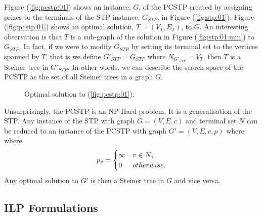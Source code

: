 Figure (\ref{fig:pcstp:01}) shows an instance, $G$, of the PCSTP created by assigning prizes to the terminals of the STP instance, $G_{STP}$, in Figure (\ref{fig:stp:01}).
Figure (\ref{fig:pcstp:01})
shows an optimal solution, $T = (V_T, E_T)$, to $G$. An interesting observation is that
$T$ is a sub-graph of the solution in Figure (\ref{fig:stp:01:min}) to $G_{STP}$.
In fact, if we were to modify $G_{STP}$ by setting its terminal set to the vertices spanned
by $T$, that is we define $G'_{STP} =  G_{STP}$ where  $N_{G'_{STP}} = V_T$, then $T$ is a Steiner
tree in $G'_{STP}$. In other words, we can describe the search space of the PCSTP
 as the set of all Steiner trees in a graph $G$.

\begin{figure}[h]\centering
{}
\caption{Optimal solution to (\ref{fig:pcstp:01})\textnormal{.}}
\label{fig:pcstp:01:opt}
\end{figure}

Unsurprisingly, the PCSTP is an NP-Hard problem. It is a generalisation of the STP. Any instance of
the STP with graph $G = (V, E, c)$ and terminal set $N$ can be reduced to an instance of the PCSTP
with graph $G' = (V, E, c, p)$ where
where
$$p_v =
\begin{cases}
  \infty & v \in N\mathnormal{,} \\
  0 & \mathnormal{otherwise.}
\end{cases}$$
Any optimal solution to $G'$ is then a Steiner tree in $G$ and vice versa.
\subsection{ILP Formulations}
